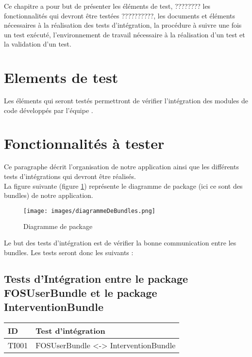   
  Ce chapitre a pour but de présenter les éléments de test, ???????? les fonctionnalités qui devront être testées ??????????, les documents et éléments nécessaires à la réalisation des tests d'intégration, la procédure à suivre une fois un test exécuté, l'environnement de travail nécessaire à la réalisation d'un test et la validation d'un test. 
 
 
  \section{Elements de test}
 	Les éléments qui seront testés permettront de vérifier l'intégration des modules de code développés par l'équipe \nomEquipe.
 	
 \section{Fonctionnalités à tester}
 	Ce paragraphe décrit l'organisation de notre application ainsi que les différents tests d'intégrations qui devront être réalisés. \\
 	
 	La figure suivante (figure \ref{diagrammeDeBundles}) représente le diagramme de package (ici ce sont des bundles) de notre application.
 	\begin{figure}[H]
 		\centering
 		\texttt{[image: images/diagrammeDeBundles.png]}
 		\caption{Diagramme de package}
 		\label{diagrammeDeBundles}
 	\end{figure}
 	
 	Le but des tests d'intégration est de vérifier la bonne communication entre les bundles. Les tests seront donc les suivants :
 	
 	\subsection*{Tests d'Intégration entre le package FOSUserBundle et le package InterventionBundle}
 	
 	\begin{center}
    		\begin{tabular}[h]{|p{}|p{}|}
		\hline
			ID & Test d'intégration \\\hline
			TI001 & FOSUserBundle <-> InterventionBundle \\\hline
    	 	\end{tabular}
  	\end{center}
  	
